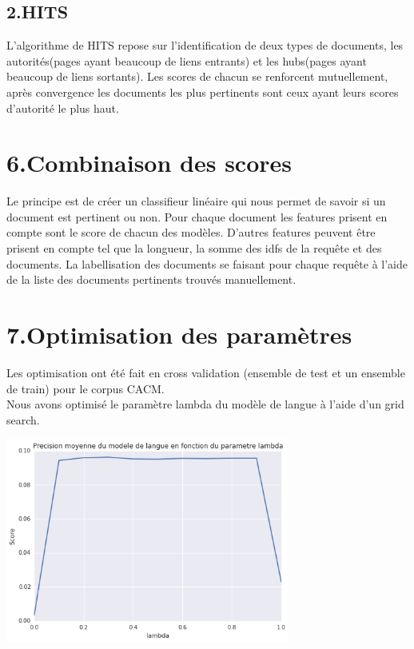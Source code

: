 \documentclass[a4paper,11pt]{report}
\begin{document}
\subsection*{2.HITS}
L'algorithme de HITS repose sur l'identification de deux types de documents, les autorités(pages ayant beaucoup de liens entrants) et les hubs(pages ayant beaucoup de liens sortants). Les scores de chacun se renforcent mutuellement, après convergence les documents les plus pertinents sont ceux ayant leurs scores d'autorité le plus haut.











\section*{6.Combinaison des scores}

Le principe est de créer un classifieur linéaire qui nous permet de savoir si un document est pertinent ou non. Pour chaque document les features prisent en compte sont le score de chacun des modèles. D'autres features peuvent être prisent en compte tel que la longueur, la somme des idfs de la requête et des documents. La labellisation des documents se faisant pour chaque requête à l'aide de la liste des documents pertinents trouvés manuellement.

\section*{7.Optimisation des paramètres}
Les optimisation ont été fait en cross validation (ensemble de test et un ensemble de train) pour le corpus CACM.\\
Nous avons optimisé le paramètre lambda du modèle de langue à l'aide d'un grid search.\\
 \begin{center}
 \includegraphics[width=0.7\textwidth]{lambdaLM}
\end{center}
\end{document}
